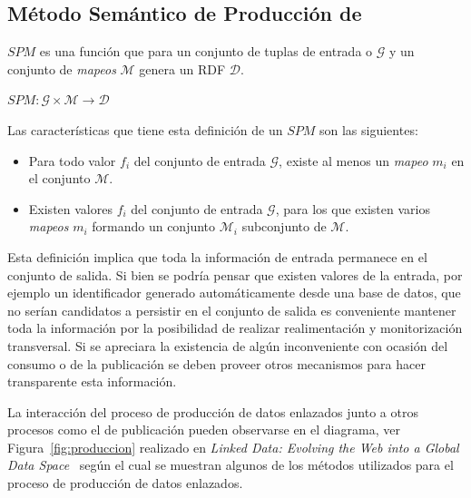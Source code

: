 \subsection{Método Semántico de Producción de \linkeddata}\label{method-prod-def}
\begin{definition}
$SPM$ es una función que para un conjunto de tuplas de entrada o \dataset $\mathcal{G}$ y un conjunto de \textit{mapeos} $\mathcal{M}$  
genera un \dataset RDF $\mathcal{D}$.
\end{definition}

\begin{center}
    $SPM : \mathcal{G} \times \mathcal{M} \longrightarrow \mathcal{D}$
\end{center}
Las características que tiene esta definición de un $SPM$ son las siguientes:
\begin{itemize}
 \item Para todo valor $f_{i}$ del conjunto de entrada $\mathcal{G}$, existe al menos un
\textit{mapeo} $m_{i}$ en el conjunto $\mathcal{M}$.
 \item Existen valores $f_{i}$ del conjunto de entrada $\mathcal{G}$, para los que existen
varios \textit{mapeos} $m_{i}$ formando un conjunto $\mathcal{M}_{i}$ subconjunto de $\mathcal{M}$.
\end{itemize}

Esta definición implica que toda la información de entrada permanece en el conjunto de salida. Si bien
se podría pensar que existen valores de la entrada, por ejemplo un identificador generado automáticamente desde
una base de datos, que no serían candidatos a persistir en el conjunto de salida es conveniente mantener
toda la información por la posibilidad de realizar realimentación y monitorización transversal. Si se apreciara 
la existencia de algún inconveniente con ocasión del consumo o de la publicación se deben proveer otros mecanismos para
hacer transparente esta información.

La interacción del proceso de producción de datos enlazados junto a otros procesos como el de publicación pueden
observarse en el diagrama, ver Figura~\ref{fig:produccion} realizado en \textit{Linked Data: Evolving the Web into a Global Data Space}~\cite{Heath_Bizer_2011} según
el cual se muestran algunos de los métodos utilizados para el proceso de producción de datos enlazados.

